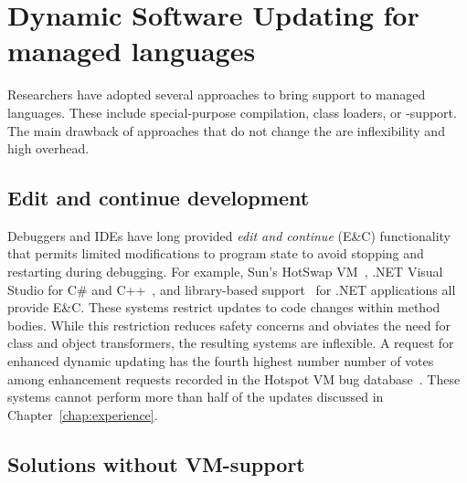 \section{Dynamic Software Updating for managed languages}

Researchers have adopted several approaches to bring \USD support to managed
languages. These include special-purpose compilation, class loaders,
or \VM-support. The main drawback of approaches that do not change the \VM
are inflexibility and high overhead.

\subsection{Edit and continue development}

Debuggers and IDEs have long provided \emph{edit and continue} (E\&C)
functionality that permits limited modifications to program state to avoid
stopping and restarting during debugging. For example, Sun's HotSwap
VM~\cite{JVMhotswap, Dmit01a}, .NET Visual Studio for C\# and
C++~\cite{VSEnC}, and library-based support~\cite{eaddy05enc} for .NET
applications all provide E\&C.  These systems restrict updates to code
changes within method bodies.  While this restriction reduces safety
concerns and obviates the need for class and object transformers, the
resulting systems are inflexible. A request for enhanced dynamic updating
has the fourth highest number number of votes among enhancement requests
recorded in the Hotspot VM bug database~\cite{voted-bug,bug-rank-list}.
These systems cannot perform more than half of the
updates discussed in Chapter~\ref{chap:experience}.


\subsection{Solutions without VM-support}

